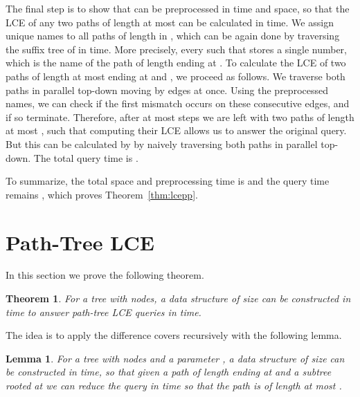 \documentclass [10pt]{article}
\newtheorem{lemma}{Lemma}
\newtheorem{theorem}{Theorem}
\begin{document}
The final step is to show that  can be preprocessed in  time and space, so that the LCE of any two
paths of length at most  can be calculated in  time. We assign unique names to all paths of length  in , which can be
again done by traversing the suffix tree of  in  time. More precisely, every  such that  stores
a single number, which is the name of the path of length  ending at . To calculate the LCE of
two paths of length at most  ending at  and , we proceed as follows. We traverse both paths in parallel
top-down moving by  edges at once. Using the preprocessed names, we can check if the first mismatch occurs on these 
consecutive edges, and if so terminate. Therefore, after at most  steps we are left with two paths of length at most , such
that computing their LCE allows us to answer the original query. But this can be calculated by
by naively traversing both paths in parallel top-down. The total query time is .

To summarize, the total space and preprocessing time is  and the query time remains , which proves
Theorem~\ref{thm:lcepp}.

\section{Path-Tree LCE}
\label{sec:path-tree}

In this section we prove the following theorem.
\begin{theorem}
For a tree  with  nodes, a data structure of size  can be constructed in  time to answer path-tree LCE queries in
 time. 
\label{thm:lcept}
\end{theorem}

\noindent The idea is to apply the difference covers recursively with the following lemma.

\begin{lemma}
For a tree  with  nodes and a parameter , a data structure of size  can be constructed in  time, so that given a path of
length  ending at  and a subtree rooted at  we can reduce the query  in  time so that
the path is of length at most .
\label{lem:path-tree reduction}
\end{lemma}
\end{document}
